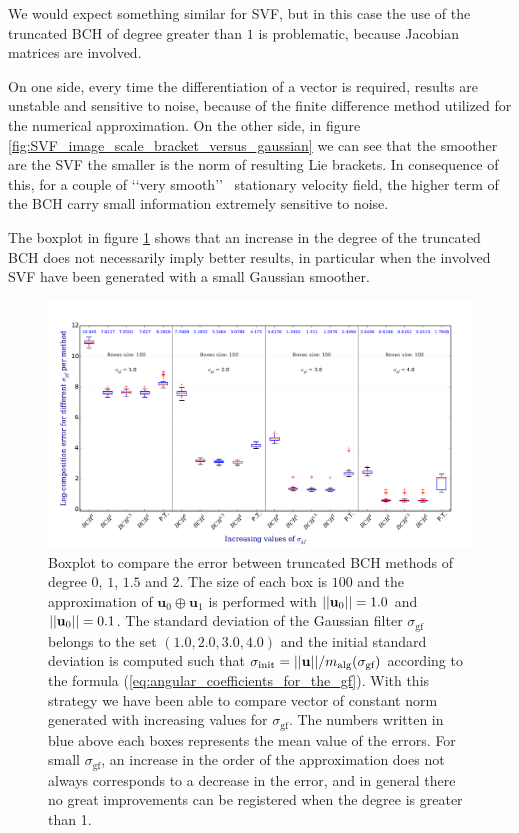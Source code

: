 We would expect something similar for SVF, but in this case the use of the truncated BCH of degree greater than $1$ is problematic, because Jacobian matrices are involved.

On one side, every time the differentiation of a vector is required, results are unstable and sensitive to noise, because of the finite difference method utilized for the numerical approximation. On the other side, in figure \ref{fig:SVF_image_scale_bracket_versus_gaussian} we can see that the smoother are the SVF the smaller is the norm of resulting Lie brackets. In consequence of this, for a couple of \lq\lq very smooth\rq\rq~ stationary velocity field, the higher term of the BCH carry small information extremely sensitive to noise.

The boxplot in figure \ref{fig:SVF_boxplot_comparisons_BCH} shows that an increase in the degree of the truncated BCH does not necessarily imply better results, in particular when the involved SVF have been generated with a small Gaussian smoother.


\begin{figure}[!ht]
	\hspace{-0.5cm}
	\includegraphics[scale=0.5]{figures/SVF_boxplot_comparisons_BCH.pdf}
	\caption{Boxplot to compare the error between truncated BCH methods of degree $0$, $1$, $1.5$ and $2$. The size of each box is $100$ and the approximation of $\mathbf{u}_{0}\oplus \mathbf{u}_1$ is performed with $\vert\lvert \mathbf{u}_{0} \rvert\vert = 1.0$ and $\vert\lvert \mathbf{u}_{0} \rvert\vert = 0.1$. The standard deviation of the Gaussian filter $\sigma_{\text{gf}}$ belongs to the set $(1.0, 2.0, 3.0, 4.0)$ and the initial standard deviation is computed such that $\sigma_{\text{init}} = \vert\lvert \mathbf{u} \rvert\vert/m_{\text{alg}}(\sigma_{\text{gf}})$ according to the formula (\ref{eq:angular_coefficients_for_the_gf}). With this strategy we have been able to compare vector of constant norm generated with increasing values for $\sigma_{\text{gf}}$. The numbers written in blue above each boxes represents the mean value of the errors. For small $\sigma_{\text{gf}}$, an increase in the order of the approximation does not always corresponds to a decrease in the error, and in general there no great improvements can be registered when the degree is greater than 1. }
	\label{fig:SVF_boxplot_comparisons_BCH}
\end{figure}



